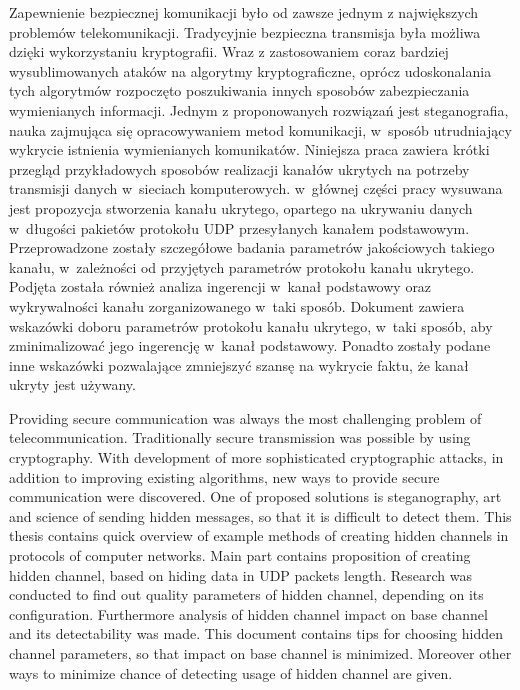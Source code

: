 \documentclass[a4paper, twoside, 12pt]{report}
\newenvironment{abstractpage}
  {\vspace*{\fill}\thispagestyle{empty}}
    {\vfill}
\renewenvironment{abstract}[1]
      {\bigskip\selectlanguage{#1}%
             \begin{center}\bfseries\abstractname\end{center}}
           {\par\bigskip}
\begin{document}



\begin{abstractpage}
\begin{abstract}{polish}
    Zapewnienie bezpiecznej komunikacji było od zawsze jednym z największych
    problemów telekomunikacji. Tradycyjnie bezpieczna transmisja była możliwa
    dzięki wykorzystaniu kryptografii. Wraz z zastosowaniem coraz bardziej wysublimowanych
    ataków na algorytmy kryptograficzne, oprócz udoskonalania tych algorytmów rozpoczęto
    poszukiwania innych sposobów zabezpieczania wymienianych informacji. Jednym
    z proponowanych rozwiązań jest steganografia, nauka zajmująca się opracowywaniem
    metod komunikacji, w~sposób utrudniający wykrycie istnienia wymienianych komunikatów.
    Niniejsza praca zawiera krótki przegląd przykładowych sposobów
    realizacji kanałów ukrytych na potrzeby transmisji danych w~sieciach komputerowych.
    w~głównej części pracy wysuwana jest propozycja stworzenia kanału ukrytego, opartego na ukrywaniu
    danych w~długości pakietów protokołu UDP przesyłanych kanałem podstawowym.
    Przeprowadzone
    zostały szczegółowe badania parametrów jakościowych takiego kanału, w~zależności
    od przyjętych parametrów protokołu kanału ukrytego. Podjęta została również
    analiza ingerencji w~kanał podstawowy oraz wykrywalności kanału zorganizowanego w~taki sposób.
    Dokument zawiera wskazówki doboru parametrów protokołu kanału ukrytego, w~taki sposób, aby
    zminimalizować jego ingerencję w~kanał podstawowy. Ponadto zostały podane inne
    wskazówki pozwalające zmniejszyć szansę na wykrycie faktu, że kanał ukryty jest
    używany.
\end{abstract}

\begin{abstract}{english}
    Providing secure communication was always the most challenging problem
    of telecommunication. Traditionally secure transmission was possible by
    using cryptography. With development of more sophisticated cryptographic attacks,
    in addition to improving existing algorithms, new ways to provide secure communication
    were discovered. One of proposed solutions is steganography, art and science
    of sending hidden messages, so that it is difficult to detect them. This thesis
    contains quick overview of example methods of creating hidden channels in
    protocols of computer networks. Main part contains proposition of creating
    hidden channel, based on hiding data in UDP packets length. Research was
    conducted to find out quality parameters of hidden channel, depending on
    its configuration. Furthermore analysis of hidden channel impact on base channel
    and its detectability was made. This document contains tips for choosing hidden
    channel parameters, so that impact on base channel is minimized. Moreover
    other ways to minimize chance of detecting usage of hidden channel are given.
\end{abstract}
\end{abstractpage}
\end{document}
